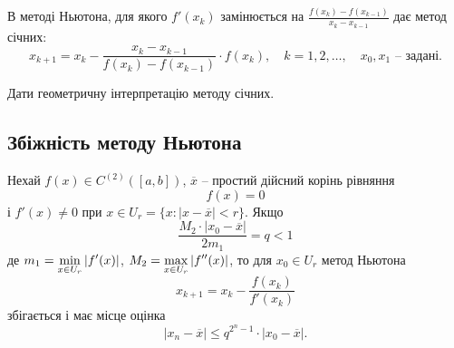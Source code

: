 В методі Ньютона, для якого $f'(x_k)$ замінюється на $\frac{f(x_k)-f(x_{k-1})}{x_k-x_{k-1}}$ дає метод січних: \[ x_{k+1} = x_k - \dfrac{x_k-x_{k-1}}{f(x_k)-f(x_{k-1})}\cdot f(x_k), \quad k = 1,2,\ldots, \quad x_0,x_1\text{ -- задані}.\]

\begin{problem} 
	Дати геометричну інтерпретацію методу січних.
\end{problem}

\subsection{Збіжність методу Ньютона}

\begin{theorem}
	Нехай $f(x)\in C^{(2)}([a,b])$, $\overline{x}$ -- простий дійсний корінь рівняння
	\begin{equation}
		\label{eq:2.10}
		f (x) = 0
	\end{equation}
	і $f'(x) \ne 0$ при $x\in U_r= \{x: |x -\overline{x}| < r\}$. Якщо
	\begin{equation}
		\label{eq:2.11}
		\dfrac{M_2\cdot|x_0-\overline{x}|}{2m_1} = q < 1
	\end{equation}
	де $m_1 = \displaystyle\min\limits_{x\in U_r} |f'(x)|$, $M_2 = \displaystyle\max\limits_{x\in U_r} |f''(x)|$, то для $x_0 \in U_r$ метод Ньютона 
	\begin{equation}
		\label{eq:2.12}
		x_{k+1} = x_k - \dfrac{f(x_k)}{f'(x_k)}
	\end{equation}
	збігається і має місце оцінка
	\begin{equation}
		\label{eq:2.13}
		|x_n - \overline{x}| \le q^{2^n-1} \cdot |x_0 - \overline{x}|.
	\end{equation}
\end{theorem}

